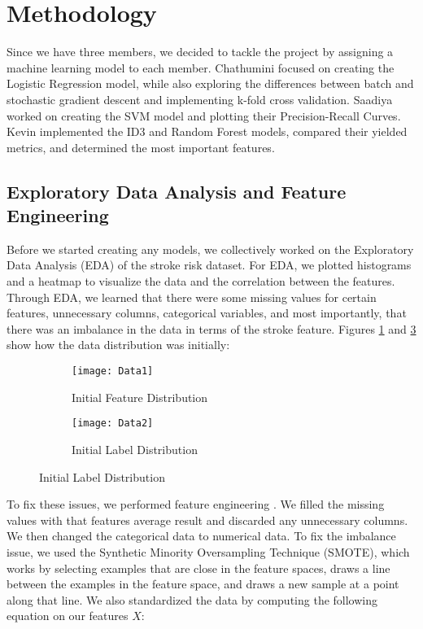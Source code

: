 \section{Methodology}
\label{sec:methodology}

Since we have three members, we decided to tackle the project by assigning a machine learning model to each member. Chathumini focused on creating the Logistic Regression model, while also exploring the differences between batch and stochastic gradient descent and implementing k-fold cross validation. Saadiya worked on creating the SVM model and plotting their Precision-Recall Curves. Kevin implemented the ID3 and Random Forest models, compared their yielded metrics, and determined the most important features.

\subsection{Exploratory Data Analysis and Feature Engineering}
\label{sec:methodology:Exploratory Data Analysis and Feature Engineering}

Before we started creating any models, we collectively worked on the Exploratory Data Analysis (EDA) of the stroke risk dataset. For EDA, we plotted histograms and a heatmap to visualize the data and the correlation between the features. Through EDA, we learned that there were some missing values for certain features, unnecessary columns, categorical variables, and most importantly, that there was an imbalance in the data in terms of the stroke feature. Figures \ref{fig:Figure1} and \ref{fig:Figure2} show how the data distribution was initially:

\begin{figure}[ht]
    \centering
    \begin{subfigure}[t]{0.4\textwidth}
        \centering\texttt{[image: Data1]}
        \caption{Initial Feature Distribution}
        \label{fig:Figure1}
    \end{subfigure}
    \begin{subfigure}[t]{0.3\textwidth}
        \centering\texttt{[image: Data2]}
        \caption{Initial Label Distribution}
        \label{fig:Figure2}
    \end{subfigure}
\end{figure}

\noindent To fix these issues, we performed feature engineering \cite{Stroke_Prediction}. We filled the missing values with that features average result and discarded any unnecessary columns. We then changed the categorical data to numerical data. To fix the imbalance issue, we used the Synthetic Minority Oversampling Technique (SMOTE), which works by selecting examples that are close in the feature spaces, draws a line between the examples in the feature space, and draws a new sample at a point along that line. We also standardized the data by computing the following equation on our features $X$:

